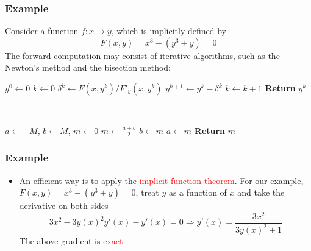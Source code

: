 \documentclass{beamer}
\begin{document}
\begin{frame}
	\frametitle{Example}

	Consider a function $f:x\rightarrow y$, which is implicitly defined by
	$$F(x,y) = x^3 - (y^3+y) = 0$$
	The forward computation may consist of iterative algorithms, such as the Newton's method and the bisection method:

	\vspace{-0.5em}

	\begin{minipage}[t]{0.48\textwidth}
		\centering
		\begin{algorithmic}
			\State $y^0 \gets 0$
			\State $k \gets 0$
			\State $\delta^k \gets F(x, y^k)/F'_y(x,y^k)$
			\State $y^{k+1}\gets y^k - \delta^k$
			\State $k \gets k+1$
			\EndWhile
			\State \textbf{Return} $y^k$
		\end{algorithmic}
	\end{minipage}~
	\begin{minipage}[t]{0.48\textwidth}
		\centering
		\begin{algorithmic}
			\State $a \gets -M$, $b \gets M$, $m \gets 0$
			\While {$|F(x, m)|>\epsilon$}
			\State $m \gets \frac{a+b}{2}$
			\If{$F(x, m)>0$}
			\State $b \gets m$
			\Else
			\State $a \gets m$
			\EndIf
			\EndWhile
			\State \textbf{Return} $m$
		\end{algorithmic}

	\end{minipage}

\end{frame}

\begin{frame}
	\frametitle{Example}

	\begin{itemize}
		\item An efficient way is to apply the \textcolor{red}{implicit function theorem}. For our example, $F(x,y)=x^3-(y^3+y)=0$, treat $y$ as a function of $x$ and take the derivative on both sides
		      $$3x^2 - 3y(x)^2y'(x)-y'(x)=0\Rightarrow y'(x) = \frac{3x^2}{3y(x)^2+1}$$
		      The above gradient is \textcolor{red}{exact}.
	\end{itemize}

\end{frame}
\end{document}
